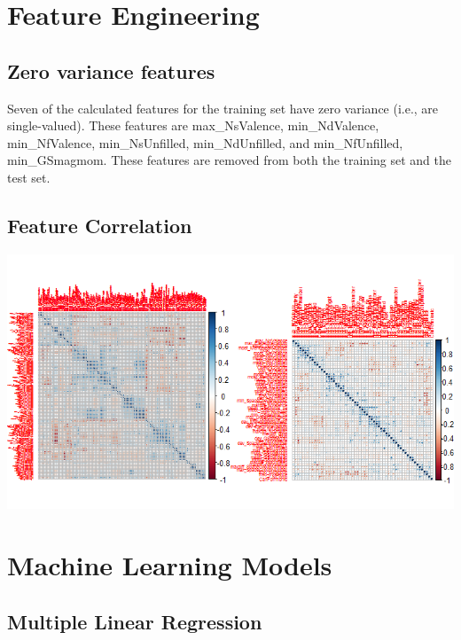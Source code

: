\documentclass[10pt, letter]{report}
\renewcommand{\=}{\, =\, }
\newcommand{\+}{\, +\, }
\renewcommand{\-}{\, -\, }
\begin{document}
\section{Feature Engineering}
\subsection{Zero variance features}
Seven of the calculated features for the training set have zero variance (i.e., are single-valued). These features are max\_NsValence, min\_NdValence, min\_NfValence, min\_NsUnfilled, min\_NdUnfilled, and min\_NfUnfilled, min\_GSmagmom. These features are removed from both the training set and the test set.

\subsection{Feature Correlation}
\begin{center}
\includegraphics[scale = 0.8]{CorrelatedFeatures.png}
\end{center}

\section{Machine Learning Models}

\subsection{Multiple Linear Regression}
\end{document}

